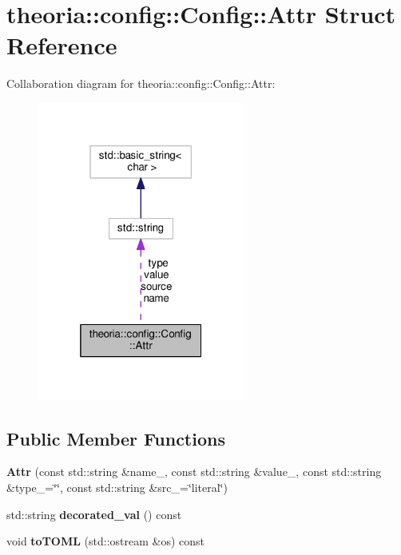\hypertarget{structtheoria_1_1config_1_1Config_1_1Attr}{}\section{theoria\+:\+:config\+:\+:Config\+:\+:Attr Struct Reference}
\label{structtheoria_1_1config_1_1Config_1_1Attr}


Collaboration diagram for theoria\+:\+:config\+:\+:Config\+:\+:Attr\+:\nopagebreak
\begin{figure}[H]
\begin{center}
\leavevmode
\includegraphics[width=193pt]{structtheoria_1_1config_1_1Config_1_1Attr__coll__graph}
\end{center}
\end{figure}
\subsection*{Public Member Functions}
\begin{DoxyCompactItemize}
\item 
\mbox{\label{structtheoria_1_1config_1_1Config_1_1Attr_ab06451bb786404d66a1fce58229310f6}} 
{\bfseries Attr} (const std\+::string \&name\+\_\+, const std\+::string \&value\+\_\+, const std\+::string \&type\+\_\+=\char`\"{}\char`\"{}, const std\+::string \&src\+\_\+=\char`\"{}literal\char`\"{})
\item 
\mbox{\label{structtheoria_1_1config_1_1Config_1_1Attr_a9b962e373741badc6253b5aa01875252}} 
std\+::string {\bfseries decorated\+\_\+val} () const
\item 
\mbox{\label{structtheoria_1_1config_1_1Config_1_1Attr_a2a9664369d7c716e454b942607febeb1}} 
void {\bfseries to\+T\+O\+ML} (std\+::ostream \&os) const
\end{DoxyCompactItemize}
